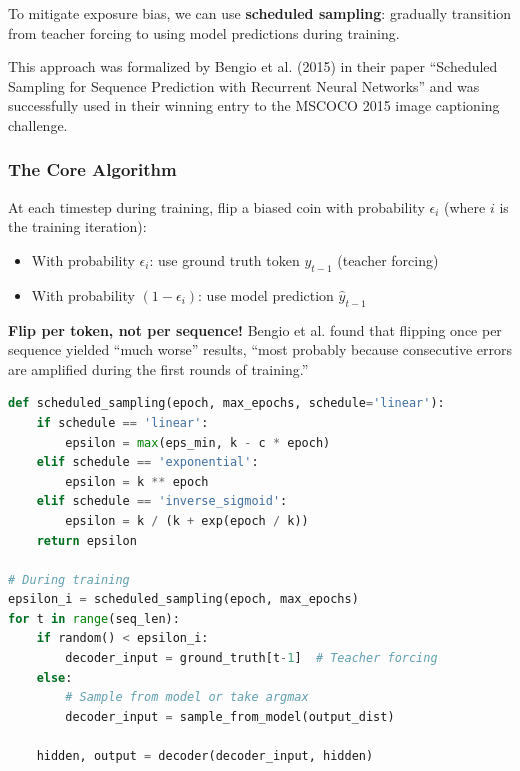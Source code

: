 \documentclass{article}
\begin{document}
To mitigate exposure bias, we can use \textbf{scheduled sampling}: gradually transition from teacher forcing to using model predictions during training.

This approach was formalized by Bengio et al. (2015) in their paper ``Scheduled Sampling for Sequence Prediction with Recurrent Neural Networks'' and was successfully used in their winning entry to the MSCOCO 2015 image captioning challenge.

\subsubsection{The Core Algorithm}

At each timestep during training, flip a biased coin with probability $\epsilon_i$ (where $i$ is the training iteration):
\begin{itemize}
\item With probability $\epsilon_i$: use ground truth token $y_{t-1}$ (teacher forcing)
\item With probability $(1-\epsilon_i)$: use model prediction $\hat{y}_{t-1}$
\end{itemize}

\begin{tcolorbox}[colback=orange!5!white, colframe=orange!50!black, title=Important Design Choice]
\textbf{Flip per token, not per sequence!} Bengio et al. found that flipping once per sequence yielded ``much worse'' results, ``most probably because consecutive errors are amplified during the first rounds of training.''
\end{tcolorbox}

\begin{lstlisting}[language=Python, caption=Scheduled Sampling Implementation]
def scheduled_sampling(epoch, max_epochs, schedule='linear'):
    if schedule == 'linear':
        epsilon = max(eps_min, k - c * epoch)
    elif schedule == 'exponential':
        epsilon = k ** epoch
    elif schedule == 'inverse_sigmoid':
        epsilon = k / (k + exp(epoch / k))
    return epsilon

# During training
epsilon_i = scheduled_sampling(epoch, max_epochs)
for t in range(seq_len):
    if random() < epsilon_i:
        decoder_input = ground_truth[t-1]  # Teacher forcing
    else:
        # Sample from model or take argmax
        decoder_input = sample_from_model(output_dist)
    
    hidden, output = decoder(decoder_input, hidden)
\end{lstlisting}
\end{document}

